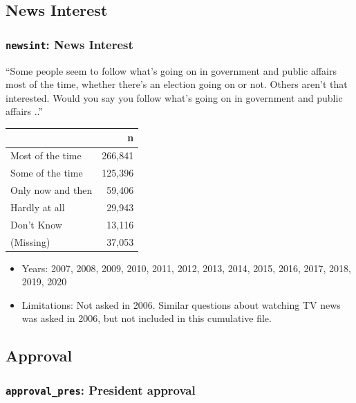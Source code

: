 \documentclass[10pt,article,oneside]{memoir}
\theoremstyle{definition}
\begin{document}
\hypertarget{news-interest}{%
\subsection{News Interest}\label{news-interest}}

\hypertarget{newsint-news-interest}{%
\subsubsection{\texorpdfstring{\texttt{newsint}: News
Interest}{newsint: News Interest}}\label{newsint-news-interest}}

``Some people seem to follow what's going on in government and public
affairs most of the time, whether there's an election going on or not.
Others aren't that interested. Would you say you follow what's going on
in government and public affairs ..''

\begin{table}[H]
\centering
\begin{tabular}{lr}
\toprule
 & n\\
\midrule
Most of the time & 266,841\\
Some of the time & 125,396\\
Only now and then & 59,406\\
Hardly at all & 29,943\\
Don't Know & 13,116\\
(Missing) & 37,053\\
\bottomrule
\end{tabular}
\end{table}

\begin{itemize}
\tightlist
\item
  Years: 2007, 2008, 2009, 2010, 2011, 2012, 2013, 2014, 2015, 2016,
  2017, 2018, 2019, 2020
\item
  Limitations: Not asked in 2006. Similar questions about watching TV
  news was asked in 2006, but not included in this cumulative file.
\end{itemize}

\hypertarget{approval}{%
\subsection{Approval}\label{approval}}

\hypertarget{approval_pres-president-approval}{%
\subsubsection{\texorpdfstring{\texttt{approval\_pres}: President
approval}{approval\_pres: President approval}}\label{approval_pres-president-approval}}
\end{document}
